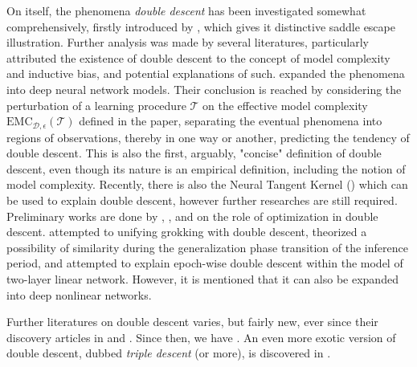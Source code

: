 \documentclass[
  journal=largetwo,
  year=2025,
  volume=37,
]{cup-journal}
\begin{document}
On itself, the phenomena \textit{double descent} has been investigated somewhat comprehensively, firstly introduced by \cite{belkin_reconciling_2019}, which gives it distinctive saddle escape illustration. Further analysis was made by several literatures, particularly attributed the existence of double descent to the concept of model complexity and inductive bias, and potential explanations of such. \cite{nakkiran_deep_2019} expanded the phenomena into deep neural network models. Their conclusion is reached by considering the perturbation of a learning procedure $\mathcal{T}$ on the effective model complexity $\mathrm{EMC}_{\mathcal{D},\epsilon}(\mathcal{T})$ defined in the paper, separating the eventual phenomena into regions of observations, thereby in one way or another, predicting the tendency of double descent. This is also the first, arguably, "concise" definition of double descent, even though its nature is an empirical definition, including the notion of model complexity. Recently, there is also the Neural Tangent Kernel (\cite{Jacot:2018:NTK}) which can be used to explain double descent, however further researches are still required. Preliminary works are done by \cite{lafon_understanding_2024}, \cite{schaeffer_double_2023}, and \cite{liu2023understandingroleoptimizationdouble} on the role of optimization in double descent. \cite{davies_unifying_2023} attempted to unifying grokking with double descent, theorized a possibility of similarity during the generalization phase transition of the inference period, and \cite{olmin2024understandingepochwisedoubledescent} attempted to explain epoch-wise double descent within the model of two-layer linear network. However, it is mentioned that it can also be expanded into deep nonlinear networks. 

Further literatures on double descent varies, but fairly new, ever since their discovery articles in \cite{belkin_reconciling_2019} and \cite{nakkiran_deep_2019}. Since then, we have \cite{shi2024homophilymodulatesdoubledescent,schaeffer_double_2023,quetu_can_2023,lafon_understanding_2024,neal2019biasvariancetradeofftextbooksneed,davies_unifying_2023,quetu_can_2023-1,liu2023understandingroleoptimizationdouble,mei2020generalizationerrorrandomfeatures,mei2019generalization,adlam2020understandingdoubledescentrequires,transtrum2025egaddoubledescentexplained,liu2021kernelregressionhighdimensions,allerbo2025changingkerneltrainingleads,pezeshki2021multiscalefeaturelearningdynamics,brellmann2024on,nakkiran2019moredata,mei2019randomfeatures,heckel2020early,nakkiran2020regularization,Belkin_2020,Yang_2024,spiess2023doublesingledescentcausal,nakkiran2021optimalregularizationmitigatedouble,zhang2024manipulatingsparsedoubledescent,cherkassky2024understand,nakkiran2019datahurtlinearregression}. An even more exotic version of double descent, dubbed \textit{triple descent} (or more), is discovered in \cite{d_ascoli_triple_2020}. 
\end{document}
